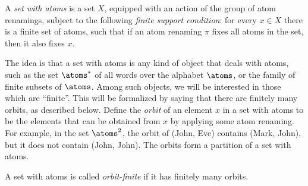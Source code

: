 

\begin{definition}
    A \emph{set with atoms} is a set $X$, equipped with an action of the group of atom renamings, subject to the following \emph{finite support condition}: for every $x \in X$ there is a finite set of atoms, such that if an atom renaming $\pi$ fixes all atoms in the set, then it also fixes $x$.
\end{definition}

The idea is that a set with atoms is any kind of object that deals with atoms, such as the set $\atoms^*$ of all words over the alphabet $\atoms$, or the family of finite subsets of $\atoms$. Among such objects, we will be interested in those which are ``finite''. This will be formalized by  saying that there are  finitely many orbits, as described below.
Define the \emph{orbit} of an element $x$ in a set with atoms to be the elements that can be obtained from $x$ by applying some atom renaming. For example, in the set $\atoms^2$,  the orbit of (John, Eve)   contains  (Mark, John), but it does not contain (John, John). The orbits form a partition of a set with atoms. 


\begin{definition}   A set with atoms is called \emph{orbit-finite} if it has finitely many orbits. 
\end{definition}

